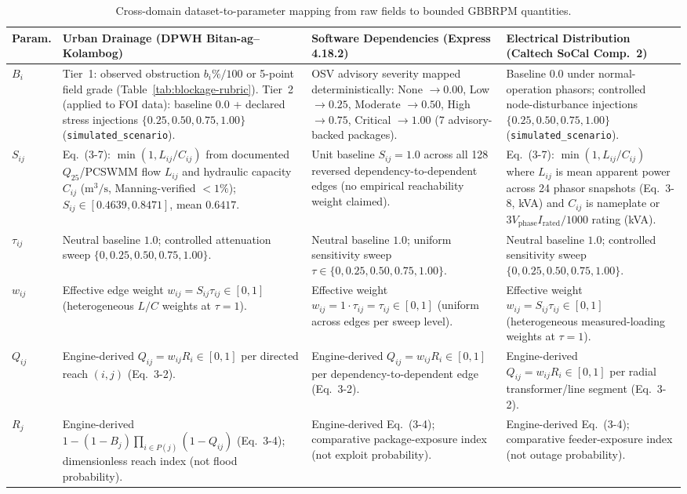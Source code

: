 \begin{table}[htbp]
\centering
\caption{Cross-domain dataset-to-parameter mapping from raw fields to bounded GBBRPM quantities.}
\label{tab:cross-domain-mapping}
\scriptsize
\setlength{\tabcolsep}{3.5pt}
\renewcommand{\arraystretch}{1.15}
\begin{tabularx}{\textwidth}{@{}>{\raggedright\arraybackslash}p{1.2cm} L L L@{}}
\toprule
Param. & Urban Drainage (DPWH Bitan-ag--Kolambog) & Software Dependencies (Express 4.18.2) & Electrical Distribution (Caltech SoCal Comp.~2)\\
\midrule
$B_i$ & Tier~1: observed obstruction $b_i\%/100$ or 5-point field grade (Table~\ref{tab:blockage-rubric}). Tier~2 (applied to FOI data): baseline $0.0$ + declared stress injections $\{0.25,0.50,0.75,1.00\}$ (\texttt{simulated\_\allowbreak scenario}). & OSV advisory severity mapped deterministically: None $\to 0.00$, Low $\to 0.25$, Moderate $\to 0.50$, High $\to 0.75$, Critical $\to 1.00$ (7 advisory-backed packages). & Baseline $0.0$ under normal-operation phasors; controlled node-disturbance injections $\{0.25,0.50,0.75,1.00\}$ (\texttt{simulated\_\allowbreak scenario}).\\
$S_{ij}$ & Eq.~(3-7): $\min(1,L_{ij}/C_{ij})$ from documented $Q_{25}$/PCSWMM flow $L_{ij}$ and hydraulic capacity $C_{ij}$ ($\mathrm{m}^3/\mathrm{s}$, Manning-verified $<1\%$); $S_{ij}\in[0.4639,0.8471]$, mean $0.6417$. & Unit baseline $S_{ij}=1.0$ across all 128 reversed dependency-to-dependent edges (no empirical reachability weight claimed). & Eq.~(3-7): $\min(1,L_{ij}/C_{ij})$ where $L_{ij}$ is mean apparent power across 24 phasor snapshots (Eq.~3-8, kVA) and $C_{ij}$ is nameplate or $3V_{\mathrm{phase}}I_{\mathrm{rated}}/1000$ rating (kVA).\\
$\tau_{ij}$ & Neutral baseline $1.0$; controlled attenuation sweep $\{0,0.25,0.50,0.75,1.00\}$. & Neutral baseline $1.0$; uniform sensitivity sweep $\tau\in\{0,0.25,0.50,0.75,1.00\}$. & Neutral baseline $1.0$; controlled sensitivity sweep $\{0,0.25,0.50,0.75,1.00\}$.\\
$w_{ij}$ & Effective edge weight $w_{ij}=S_{ij}\tau_{ij}\in[0,1]$ (heterogeneous $L/C$ weights at $\tau=1$). & Effective weight $w_{ij}=1\cdot\tau_{ij}=\tau_{ij}\in[0,1]$ (uniform across edges per sweep level). & Effective weight $w_{ij}=S_{ij}\tau_{ij}\in[0,1]$ (heterogeneous measured-loading weights at $\tau=1$).\\
$Q_{ij}$ & Engine-derived $Q_{ij}=w_{ij}R_i\in[0,1]$ per directed reach $(i,j)$ (Eq.~3-2). & Engine-derived $Q_{ij}=w_{ij}R_i\in[0,1]$ per dependency-to-dependent edge (Eq.~3-2). & Engine-derived $Q_{ij}=w_{ij}R_i\in[0,1]$ per radial transformer/line segment (Eq.~3-2).\\
$R_j$ & Engine-derived $1-(1-B_j)\prod_{i\in P(j)}(1-Q_{ij})$ (Eq.~3-4); dimensionless reach index (not flood probability). & Engine-derived Eq.~(3-4); comparative package-exposure index (not exploit probability). & Engine-derived Eq.~(3-4); comparative feeder-exposure index (not outage probability).\\
\bottomrule
\end{tabularx}
\end{table}

